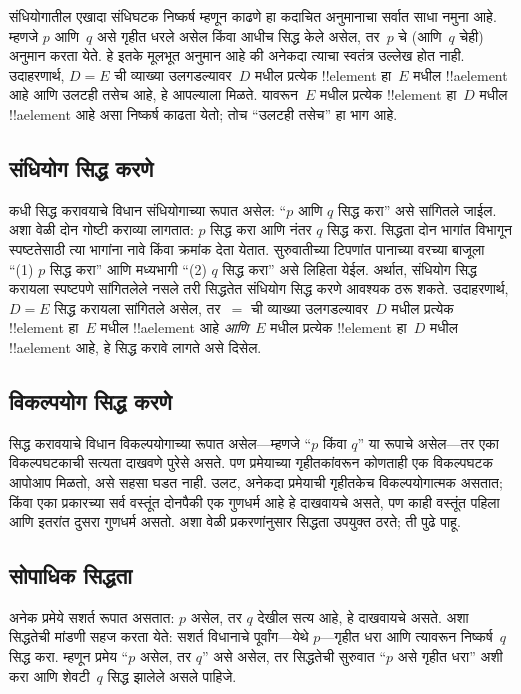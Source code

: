 \documentclass[../../../include/open-logic-section]{subfiles}
\begin{document}
संधियोगातील एखादा संधिघटक निष्कर्ष म्हणून काढणे हा कदाचित अनुमानाचा सर्वात साधा नमुना आहे. म्हणजे $p$ आणि~$q$ असे गृहीत धरले असेल किंवा आधीच सिद्ध केले असेल, तर~$p$ चे (आणि~$q$ चेही) अनुमान करता येते. हे इतके मूलभूत अनुमान आहे की अनेकदा त्याचा स्वतंत्र उल्लेख होत नाही. उदाहरणार्थ, $D = E$ ची व्याख्या उलगडल्यावर~$D$ मधील प्रत्येक !!{element} हा~$E$ मधील !!a{element} आहे आणि उलटही तसेच आहे, हे आपल्याला मिळते. यावरून~$E$ मधील प्रत्येक !!{element} हा~$D$ मधील !!a{element} आहे असा निष्कर्ष काढता येतो; तोच “उलटही तसेच” हा भाग आहे.

\subsection{संधियोग सिद्ध करणे}

कधी सिद्ध करावयाचे विधान संधियोगाच्या रूपात असेल: “$p$ आणि $q$ सिद्ध करा” असे सांगितले जाईल. अशा वेळी दोन गोष्टी कराव्या लागतात: $p$ सिद्ध करा आणि नंतर $q$ सिद्ध करा. सिद्धता दोन भागांत विभागून स्पष्टतेसाठी त्या भागांना नावे किंवा क्रमांक देता येतात. सुरुवातीच्या टिपणांत पानाच्या वरच्या बाजूला “(1) $p$ सिद्ध करा” आणि मध्यभागी “(2) $q$ सिद्ध करा” असे लिहिता येईल. अर्थात, संधियोग सिद्ध करायला स्पष्टपणे सांगितलेले नसले तरी सिद्धतेत संधियोग सिद्ध करणे आवश्यक ठरू शकते. उदाहरणार्थ, $D = E$ सिद्ध करायला सांगितले असेल, तर~$=$ ची व्याख्या उलगडल्यावर~$D$ मधील प्रत्येक !!{element} हा~$E$ मधील !!a{element} आहे \emph{आणि}~$E$ मधील प्रत्येक !!{element} हा~$D$ मधील !!a{element} आहे, हे सिद्ध करावे लागते असे दिसेल.

\subsection{विकल्पयोग सिद्ध करणे}

सिद्ध करावयाचे विधान विकल्पयोगाच्या रूपात असेल---म्हणजे “$p$ किंवा $q$” या रूपाचे असेल---तर एका विकल्पघटकाची सत्यता दाखवणे पुरेसे असते. पण प्रमेयाच्या गृहीतकांवरून कोणताही एक विकल्पघटक आपोआप मिळतो, असे सहसा घडत नाही. उलट, अनेकदा प्रमेयाची गृहीतकेच विकल्पयोगात्मक असतात; किंवा एका प्रकारच्या सर्व वस्तूंत दोनपैकी एक गुणधर्म आहे हे दाखवायचे असते, पण काही वस्तूंत पहिला आणि इतरांत दुसरा गुणधर्म असतो. अशा वेळी प्रकरणांनुसार सिद्धता उपयुक्त ठरते; ती पुढे पाहू.

\subsection{सोपाधिक सिद्धता}

अनेक प्रमेये सशर्त रूपात असतात: $p$ असेल, तर $q$ देखील सत्य आहे, हे दाखवायचे असते. अशा सिद्धतेची मांडणी सहज करता येते: सशर्त विधानाचे पूर्वांग---येथे $p$---गृहीत धरा आणि त्यावरून निष्कर्ष~$q$ सिद्ध करा. म्हणून प्रमेय “$p$ असेल, तर $q$” असे असेल, तर सिद्धतेची सुरुवात “$p$ असे गृहीत धरा” अशी करा आणि शेवटी~$q$ सिद्ध झालेले असले पाहिजे.
\end{document}
